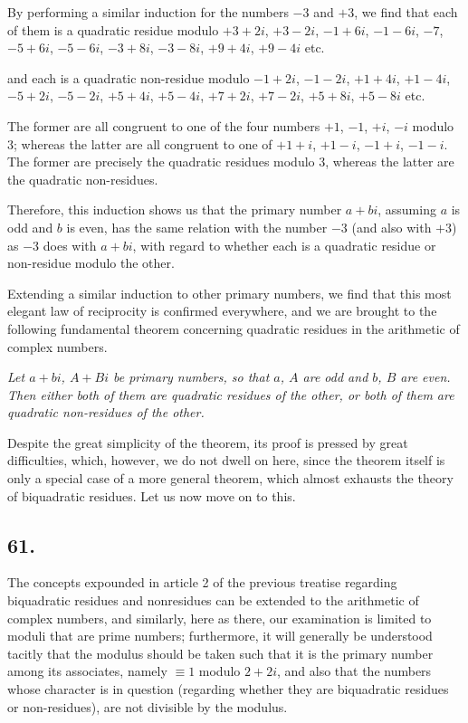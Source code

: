 \documentclass[twoside,12pt]{memoir}
\begin{document}
By performing a similar induction for the numbers \(-3\) and \(+3\), we find that each of them is a quadratic residue modulo \(+3+2 i\), \(+3-2 i\), \pagebreak%
\(-1+6 i\), \(-1-6 i\), \(-7\), \(-5+6 i\), \(-5-6 i\), \(-3+8 i\), \(-3-8 i\), \(+9+4 i\), \(+9-4 i\) etc{.}

and each is a quadratic non-residue modulo \(-1+2 i\), \(-1-2 i\), \(+1+4 i\), \(+1-4 i\), \(-5+2 i\), \(-5-2 i\), \(+5+4 i\), \(+5-4 i\), \(+7+2 i\), \(+7-2 i\), \(+5+8 i\), \(+5-8 i\) etc{.}

The former are all congruent to one of the four numbers \(+1\), \(-1\), \(+i\), \(-i\) modulo \(3\); whereas the latter are all congruent to one of \(+1+i\), \(+1-i\), \(-1+i\), \(-1-i\). The former are precisely the quadratic residues modulo \(3\), whereas the latter are the quadratic non-residues.

Therefore, this induction shows us that the primary number \(a+b i\), assuming \(a\) is odd and \(b\) is even, has the same relation with the number \(-3\) (and also with \(+3\)) as \(-3\) does with \(a+bi\), with regard to whether each is a quadratic residue or non-residue modulo the other.

Extending a similar induction to other primary numbers, we find that this most elegant law of reciprocity is confirmed everywhere, and we are brought to the following fundamental theorem concerning quadratic residues in the arithmetic of complex numbers. 
 
\textit{Let \(a+b i\), \(A+B i\) be primary numbers, so that \(a\), \(A\) are odd and \(b\), \(B\) are even.  Then either both of them are quadratic residues of the other, or both of them are quadratic non-residues of the other.} 
 
Despite the great simplicity of the theorem, its proof is pressed by great difficulties, which, however, we do not dwell on here, since the theorem itself is only a special case of a more general theorem, which almost exhausts the theory of biquadratic residues. Let us now move on to this.

\subsection*{61.}

The concepts expounded in article 2 of the previous treatise regarding biquadratic residues and nonresidues can be extended to the arithmetic of complex numbers, and similarly, here as there, our examination is limited to moduli that are prime numbers; furthermore, it will generally be understood tacitly that the modulus should be taken such that it is the primary number among its associates, namely \(\equiv 1\) modulo \(2+2i\), and also that the numbers whose character is in question (regarding whether they are biquadratic residues or non-residues), are not divisible by the modulus.
\end{document}
